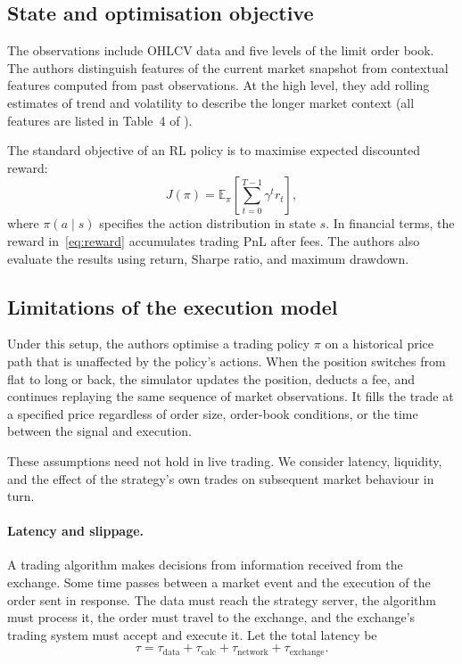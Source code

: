 \documentclass[9pt,a4paper,twocolumn]{extarticle}
\newcommand{\Exp}{\mathbb{E}}
\begin{document}
\subsection{State and optimisation objective}

The observations include OHLCV data and five levels of the limit order book. The authors
distinguish features of the current market snapshot from contextual features computed from past
observations. At the high level, they add rolling estimates of trend and volatility to describe
the longer market context (all features are listed in Table~4 of \cite{zong2024macrohft}).

The standard objective of an RL policy is to maximise expected discounted reward:
\begin{equation}
  J(\pi)=\Exp_{\pi}\!\left[
    \sum_{t=0}^{T-1}\gamma^t r_t
  \right],
  \label{eq:objective}
\end{equation}
where $\pi(a\mid s)$ specifies the action distribution in state $s$. In financial terms, the
reward in~\eqref{eq:reward} accumulates trading PnL after fees. The authors also evaluate the
results using return, Sharpe ratio, and maximum drawdown.


\subsection{Limitations of the execution model}
\label{sec:execution_limitations}

Under this setup, the authors optimise a trading policy $\pi$ on a historical price path that is
unaffected by the policy's actions. When the position switches from flat to long or back, the
simulator updates the position, deducts a fee, and continues replaying the same sequence of
market observations. It fills the trade at a specified price regardless of order size, order-book
conditions, or the time between the signal and execution.

These assumptions need not hold in live trading. We consider latency, liquidity, and the effect
of the strategy's own trades on subsequent market behaviour in turn.

\paragraph{Latency and slippage.}

A trading algorithm makes decisions from information received from the exchange. Some time
passes between a market event and the execution of the order sent in response. The data must
reach the strategy server, the algorithm must process it, the order must travel to the exchange,
and the exchange's trading system must accept and execute it. Let the total latency be
\begin{equation}
    \tau =
    \tau_{\mathrm{data}}
    + \tau_{\mathrm{calc}}
    + \tau_{\mathrm{network}}
    + \tau_{\mathrm{exchange}}.
    \label{eq:execution_latency}
\end{equation}
\end{document}
